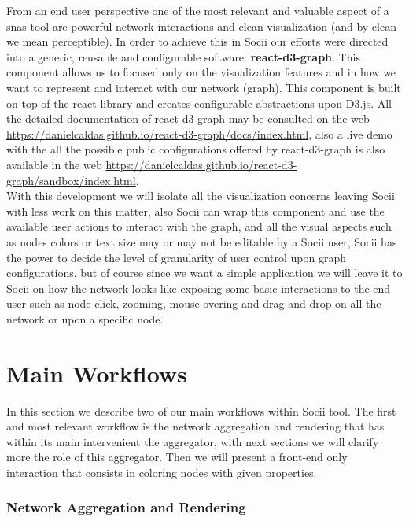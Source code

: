 From an end user perspective one of the most relevant and valuable aspect of a \glspl{sna} tool are powerful network interactions and clean visualization (and by clean we mean perceptible). In order to achieve this in Socii our efforts were directed into a generic, reusable and configurable software: \textbf{react-d3-graph}\cite{reactd3graph}. This component allows us to focused only on the visualization features and in how we want to represent and interact with our network (graph). This component is built on top of the react library and creates configurable abstractions upon D3.js. All the detailed documentation of react-d3-graph
may be consulted on the web \cite{reactd3graph}\url{https://danielcaldas.github.io/react-d3-graph/docs/index.html}, also a live demo with the all the possible public configurations offered by react-d3-graph is also available in the web \url{https://danielcaldas.github.io/react-d3-graph/sandbox/index.html}.\\
With this development we will isolate all the visualization concerns leaving Socii with less work on this matter, also Socii can wrap this component and use the available user actions to interact with the graph, and all the visual aspects such as nodes colors or text size may or may not be editable by a Socii user, Socii has the power to decide the level of granularity of user control upon graph configurations, but of course since we want a simple application we will leave it to Socii on how the network looks like exposing some basic interactions to the end user such as node click, zooming, mouse overing and drag and drop on all the network or upon a specific node.

\section{Main Workflows}

In this section we describe two of our main workflows within Socii tool. The first and most relevant workflow is the network aggregation and rendering that has within its main intervenient the aggregator, with next sections we will clarify more the role of this aggregator. Then we will present a front-end only interaction that consists in coloring nodes with given properties.

\subsubsection{Network Aggregation and Rendering}

